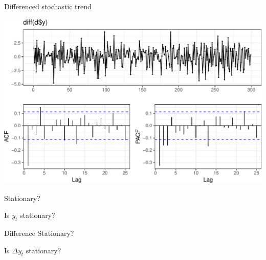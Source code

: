 \documentclass[11pt,ignorenonframetext,]{beamer}
\newenvironment{Shaded}{}{}
\newcommand{\KeywordTok}[1]{\textcolor[rgb]{0.00,0.44,0.13}{\textbf{#1}}}
\newcommand{\NormalTok}[1]{#1}
\newcommand{\OperatorTok}[1]{\textcolor[rgb]{0.40,0.40,0.40}{#1}}
\let\oldShaded\Shaded
\let\endoldShaded\endShaded
\renewenvironment{Shaded}{\footnotesize\begin{spacing}{0.9}\oldShaded}{\endoldShaded\end{spacing}}
\begin{document}
\begin{frame}[fragile]{%
\protect\hypertarget{differenced-stochastic-trend}{%
Differenced stochastic trend}}

\begin{Shaded}
\end{Shaded}

\begin{center}\includegraphics[width=\textwidth]{Lec09_files/figure-beamer/unnamed-chunk-2-1} \end{center}

\end{frame}

\begin{frame}[t]{%
\protect\hypertarget{stationary}{%
Stationary?}}

Is \(y_t\) stationary?

\end{frame}

\begin{frame}[t]{%
\protect\hypertarget{difference-stationary}{%
Difference Stationary?}}

Is \(\Delta y_t\) stationary?

\end{frame}
\end{document}
